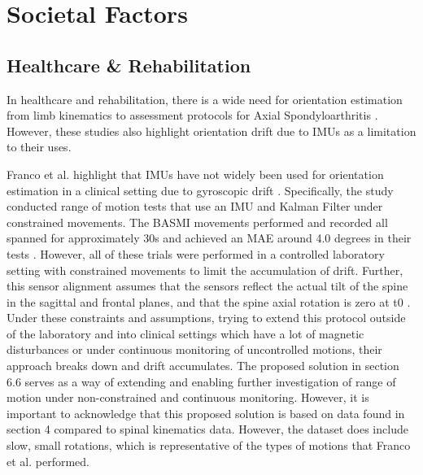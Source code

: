 \newpage
\section{Societal Factors}

\subsection{Healthcare \& Rehabilitation}
In healthcare and rehabilitation, there is a wide need for orientation estimation from limb kinematics to assessment protocols for 
Axial Spondyloarthritis \cite{franco_2021_a}. However, these studies
also highlight orientation drift due to IMUs as a limitation to their uses. 


Franco et al. highlight that IMUs have not widely been used for orientation estimation in a clinical setting due to gyroscopic drift \cite{franco_2021_a}.
Specifically, the study conducted range of motion tests that use an IMU and Kalman Filter under constrained movements. The BASMI
movements performed and recorded all spanned for approximately 30s and achieved an MAE around 4.0 degrees in their tests \cite{franco_2021_a}. 
However, all of these trials were performed
in a controlled laboratory setting with constrained movements to limit the accumulation of drift. Further, this
sensor alignment assumes that the sensors reflect the actual tilt of the
spine in the sagittal and frontal planes, and that the spine axial rotation is zero at t0 \cite{franco_2021_a}.
Under these constraints and assumptions, trying to extend this protocol outside of the laboratory and into clinical settings which have a lot 
of magnetic disturbances or under continuous monitoring of uncontrolled motions, their approach breaks down and drift accumulates. The proposed solution
in section 6.6 serves as a way of extending and enabling further investigation of range of motion under non-constrained and continuous monitoring.
However, it is important to acknowledge that this proposed solution is based on data found in section 4 compared to spinal kinematics data. However,
the dataset does include slow, small rotations, which is representative of the types of motions that Franco et al. performed.  

